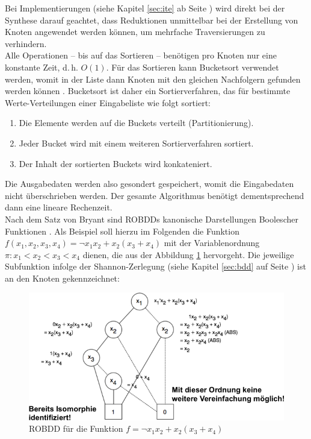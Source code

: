 Bei Implementierungen (siehe Kapitel \ref{sec:ite} ab Seite \pageref{sec:ite}) wird direkt bei der Synthese darauf geachtet, dass Reduktionen unmittelbar bei der Erstellung von Knoten angewendet werden können, um mehrfache Traversierungen zu verhindern.\\
Alle Operationen -- bis auf das Sortieren -- benötigen pro Knoten nur eine konstante Zeit, d.\,h. $O(1)$. Für das Sortieren kann Bucketsort verwendet werden, womit in der Liste dann Knoten mit den gleichen Nachfolgern gefunden werden können \cite{a2010}. Bucketsort ist daher ein Sortierverfahren, das für bestimmte Werte-Verteilungen einer Eingabeliste wie folgt sortiert:
\begin{enumerate}
	\item Die Elemente werden auf die \glqq Buckets\grqq{} verteilt (Partitionierung).
	\item Jeder \glqq Bucket\grqq{} wird mit einem weiteren Sortierverfahren sortiert.
	\item Der Inhalt der sortierten \glqq Buckets\grqq{} wird konkateniert.
\end{enumerate}
Die Ausgabedaten werden also gesondert gespeichert, womit die Eingabedaten nicht überschrieben werden. Der gesamte Algorithmus benötigt dementsprechend dann eine lineare Rechenzeit.\\
Nach dem Satz von Bryant sind ROBDDs kanonische Darstellungen Boolescher Funktionen \cite[S.677-691]{b1986}. Als Beispiel soll hierzu im Folgenden die Funktion \\$f(x_1, x_2, x_3, x_4) = \neg x_1x_2+x_2(x_3+x_4)$ mit der Variablenordnung $\pi : x_1 < x_2 < x_3 < x_4$ dienen, die aus der Abbildung \ref{fig:robdd} hervorgeht. Die jeweilige Subfunktion infolge der Shannon-Zerlegung (siehe Kapitel \ref{sec:bdd} auf Seite \pageref{sec:bdd}) ist an den Knoten gekennzeichnet:
\begin{figure}[bth]
	\centering
	\includegraphics[scale=0.9]{./img/robdd}
	\caption[ROBDD für die Funktion $f = \neg x_1x_2+x_2(x_3+x_4)$]{ROBDD für die Funktion $f = \neg x_1x_2+x_2(x_3+x_4)$}
	\label{fig:robdd}
\end{figure}\\
